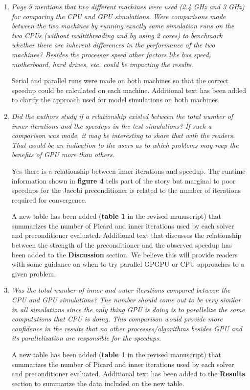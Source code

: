 \documentclass[12pt]{article} %
\begin{document}
\begin{enumerate}
\item \textit{Page 9 mentions that two different machines were used (2.4 GHz and 3 GHz) for comparing the CPU and GPU simulations. Were comparisons made between the two machines by running exactly same simulation runs on the two CPUs (without multithreading and by using 2 cores) to benchmark whether there are inherent differences in the performance of the two machines? Besides the processor speed other factors like bus speed, motherboard, hard drives, etc. could be impacting the results.}

Serial and parallel runs were made on both machines so that the correct speedup could be calculated on each machine. Additional text has been added to clarify the approach used for model simulations on both machines.

\item \textit{Did the authors study if a relationship existed between the total number of inner iterations and the speedups in the test simulations? If such a comparison was made, it may be interesting to share that with the readers. That would be an indication to the users as to which problems may reap the benefits of GPU more than others.}

Yes there is a relationship between inner iterations and speedup. The runtime information shown in \textbf{figure 4} tells part of the story but marginal to poor speedups for the Jacobi preconditioner is related to the number of iterations required for convergence. 

A new table has been added (\textbf{table 1} in the revised manuscript) that summarizes the number of Picard and inner iterations used by each solver and preconditioner evaluated. Additional text that discusses the relationship between the strength of the preconditioner and the observed speedup has been added to the \textbf{Discussion} section. We believe this will provide readers with some guidance on when to try parallel GPGPU or CPU approaches to a given problem.

\item \textit{Was the total number of inner and outer iterations compared between the CPU and GPU simulations? The number should come out to be very similar in all simulations since the only thing GPU is doing is to parallelize the same computations that CPU is doing. This comparison would provide more confidence in the results that no other processes/algorithms besides GPU and its parallelization are responsible for the speedups.}

A new table has been added (\textbf{table 1} in the revised manuscript) that summarizes the number of Picard and inner iterations used by each solver and preconditioner evaluated. Additional text has been added to the \textbf{Results} section to summarize the data included on the new table.


\end{enumerate}
\end{document}
